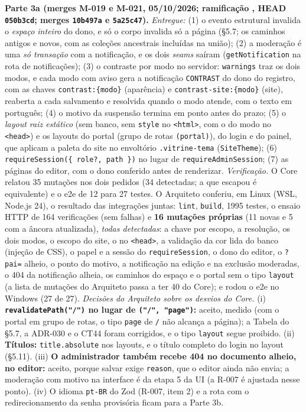 \textbf{Parte 3a (merges M-019 e M-021, 05/10/2026; ramificação , HEAD \texttt{050b3cd}; merges \texttt{10b497a} e \texttt{5a25c47}).} \emph{Entregue:} (1) o evento estrutural invalida o \emph{espaço inteiro} do dono, e só o corpo invalida só a página (\S5.7; os caminhos antigos e novos, com as coleções ancestrais incluídas na união); (2) a moderação é uma \emph{só transação} com a notificação, e os dois \emph{seams} saíram (\texttt{getNotification} na rota de notificações); (3) o contraste por modo no servidor: \texttt{warnings} traz os dois modos, e cada modo com aviso gera a notificação \texttt{CONTRAST} do dono do registro, com as chaves \texttt{contrast:\{modo\}} (aparência) e \texttt{contrast-site:\{modo\}} (site), reaberta a cada salvamento e resolvida quando o modo atende, com o texto em português; (4) o motivo da suspensão termina em ponto antes do prazo; (5) o \emph{layout raiz estático} (sem banco, sem \texttt{style} no \texttt{<html>}, com o  do modo no \texttt{<head>}) e os layouts do portal (grupo de rotas \texttt{(portal)}), do login e do painel, que aplicam a paleta do site no envoltório \texttt{.vitrine-tema} (\texttt{SiteTheme}); (6) \texttt{requireSession(\{ role?, path \})} no lugar de \texttt{requireAdminSession}; (7) as páginas do editor, com o dono conferido antes de renderizar. \emph{Verificação.} O Core relatou 35 mutações nos dois pedidos (34 detectadas; a que escapou é equivalente) e o e2e de 12 para 27 testes. O Arquiteto conferiu, em Linux (WSL, Node.js 24), o resultado das integrações juntas: \texttt{lint}, \texttt{build}, 1995 testes, o ensaio HTTP de 164 verificações (sem falhas) e \textbf{16 mutações próprias} (11 novas e 5 com a âncora atualizada), \emph{todas detectadas}: a chave por escopo, a resolução, os dois modos, o escopo do site, o  no \texttt{<head>}, a validação da cor lida do banco (injeção de CSS), o papel e a sessão do \texttt{requireSession}, o dono do editor, o \texttt{?pai=} alheio, o ponto do motivo, a notificação na edição e na exclusão moderadas, o 404 da notificação alheia, os caminhos do espaço e o portal sem o tipo \texttt{layout} (a lista de mutações do Arquiteto passa a ter 40 do Core); e rodou o e2e no Windows (27 de 27). \emph{Decisões do Arquiteto sobre os desvios do Core.} (i) \textbf{\texttt{revalidatePath("/")} no lugar de \texttt{("/", "page")}:} aceito, medido (com o portal em grupo de rotas, o tipo \texttt{page} de \texttt{/} não alcança a página); a Tabela do \S5.7, a ADR-030 e o CT44 foram corrigidos, e o tipo \texttt{layout} segue proibido. (ii) \textbf{Títulos:} \texttt{title.absolute} nos layouts, e o título completo do login no layout (\S5.11). (iii) \textbf{O administrador também recebe 404 no documento alheio, no editor:} aceito, porque salvar exige \texttt{reason}, que o editor ainda não envia; a moderação com motivo na interface é da etapa 5 da UI (a R-007 é ajustada nesse ponto). (iv) O idioma \texttt{pt-BR} do Zod (R-007, item 2) e a rota  com o redirecionamento da senha provisória ficam para a Parte 3b.

